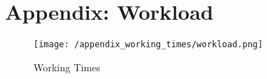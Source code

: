 \section{Appendix: Workload}
\begin{figure}[H]
  \center
  \texttt{[image: /appendix\_working\_times/workload.png]}
  \caption{Working Times}
  \label{image:workload}
\end{figure}
\caption{Wotking Times}
